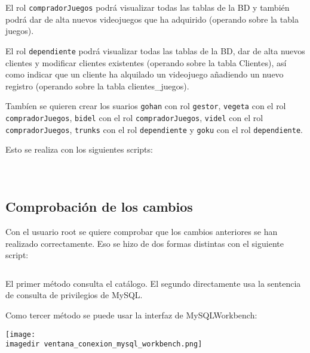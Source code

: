 \documentclass[a4paper, 11pt, oneside]{article} %
\newcommand{\scriptdir}{../scripts/} %
\newcommand{\imagedir}{../images/} %
\begin{document}
El rol \texttt{compradorJuegos} podrá visualizar todas las tablas de la BD y también podrá dar de alta nuevos videojuegos que ha adquirido (operando sobre la tabla juegos).

El rol \texttt{dependiente} podrá visualizar todas las tablas de la BD, dar de alta nuevos clientes y modificar clientes existentes (operando sobre la tabla Clientes), así como indicar que un cliente ha alquilado un videojuego añadiendo un nuevo registro (operando sobre la tabla clientes\_juegos).

Tambíen se quieren crear los suarios \texttt{gohan} con rol \texttt{gestor}, \texttt{vegeta} con el rol \texttt{compradorJuegos}, \texttt{bidel} con el rol \texttt{compradorJuegos}, \texttt{videl} con el rol \texttt{compradorJuegos}, \texttt{trunks} con el rol \texttt{dependiente} y \texttt{goku} con el rol \texttt{dependiente}.

Esto se realiza con los siguientes scripts:

\inputminted{mysql}{\scriptdir scripts_roles/gestor.sql}

\inputminted{mysql}{\scriptdir scripts_roles/comprador_juegos_privileges_and_role_creation.sql}

\inputminted{mysql}{\scriptdir scripts_roles/dependiente_privileges_and_role_creation.sql}


\subsection{Comprobación de los cambios}

Con el usuario root se quiere comprobar que los cambios anteriores se han realizado correctamente. Eso se hizo de dos formas distintas con el siguiente script:

\inputminted{mysql}{\scriptdir scripts/scripts_consulta_privilegios/check_privileges.sql}

El primer método consulta el catálogo. El segundo directamente usa la sentencia de consulta de privilegios de MySQL.

Como tercer método se puede usar la interfaz de MySQLWorkbench:

\texttt{[image: \\imagedir ventana\_conexion\_mysql\_workbench.png]}






\iffalse
\end{document}
